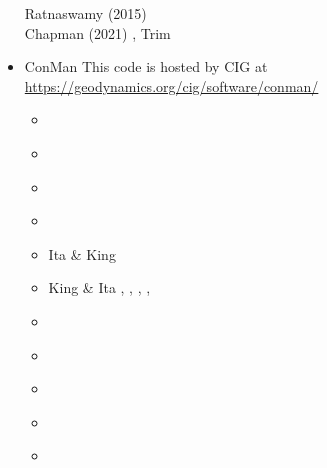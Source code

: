 \begin{itemize}
\begin{scriptsize}
\cite{vack08}
\cite{ronb12}
\cite{cuwi14}
\cite{paml14b}
Ratnaswamy \etal (2015) \cite{rasg15}\\
Chapman (2021) \cite{chap21},
Trim \etal \cite{trbs21}
\end{scriptsize}

\item {\codefont ConMan} 
This code is hosted by CIG at \url{https://geodynamics.org/cig/software/conman/}

\begin{scriptsize}
\begin{itemize}
\item[\nineteenninety] \cite{kirh90}\cite{kiri00}\cite{gurn90}\cite{huha90}\cite{kiha90}
\item[\nineteenninetyone] \cite{kell91}\cite{lekb91}
\item[\nineteenninetytwo] \cite{sqjs92}\cite{zhgu92}
\item[\nineteenninetythree] \cite{keki93}\cite{kief93}\cite{leka93}\cite{lekb93}\cite{zhgh93}\cite{zhgu93}
\item[\nineteenninetyfour] Ita \& King \cite{itki94}\cite{fari94}\cite{gaha94}\cite{guto94}
                           \cite{kiha94}\cite{leka94}\cite{leka94b}\cite{zhgu94b}
\item[\nineteenninetyfive] King \& Ita \cite{kiit95}, \cite{kian95},
                           \cite{leka95}\cite{lekb95},
                           \cite{puhj95}\cite{pujh95},
                           \cite{zhgu95b}
\item[\nineteenninetysix] \cite{laki96}\cite{leka96}
                          \cite{mozg96}\cite{zhgm96}
\item[\nineteenninetyseven] \cite{vaks97}\cite{keki97}
                            \cite{kell97}\cite{mole97}
\item[\nineteenninetyeight] \cite{kian98}\cite{itki98}
                            \cite{vack08}\cite{kian98}
                            \cite{lena98}\cite{mokm98}
\item[\nineteenninetynine] \cite{befo99}\cite{lemo99}
                           \cite{como99}\cite{cori99}
                           \cite{hagu99}\cite{roda99}
                           \cite{sigh99}
\item[\twothousand] \cite{lemo00}\cite{conr00}\cite{elha00}\cite{lemo00}

\end{itemize}
\end{scriptsize}
\end{itemize}
